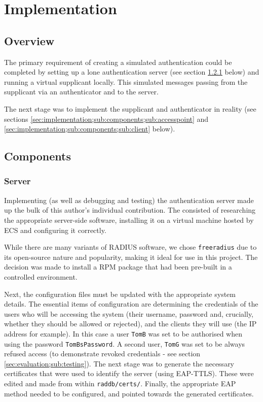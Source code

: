 \documentclass[12pt,a4paper,titlepage]{article}
\begin{document}
\newpage
\section{Implementation}

\subsection{Overview}
The primary requirement of creating a simulated authentication could be completed by setting up a lone authentication server (see section \ref{sec:implementation;sub:components;sub:server} below) and running a virtual supplicant locally. This simulated messages passing from the supplicant via an authenticator and to the server.

The next stage was to implement the supplicant and authenticator in reality (see sections \ref{sec:implementation;sub:components;sub:accesspoint} and \ref{sec:implementation;sub:components;sub:client} below).

\subsection{Components}

\subsubsection{Server}
\label{sec:implementation;sub:components;sub:server}
Implementing (as well as debugging and testing) the authentication server made up the bulk of this author's individual contribution. The consisted of researching the appropriate server-side software, installing it on a virtual machine hosted by ECS and configuring it correctly. 

While there are many variants of RADIUS software, we chose \texttt{freeradius} due to its open-source nature and popularity, making it ideal for use in this project. The decision was made to install a RPM package that had been pre-built in a controlled environment.

Next, the configuration files must be updated with the appropriate system details. The essential items of configuration are determining the credentials of the users who will be accessing the system (their username, password and, crucially, whether they should be allowed or rejected), and the clients they will use (the IP address for example). In this case a user \texttt{TomB} was set to be authorised when using the password \texttt{TomBsPassword}. A second user, \texttt{TomG} was set to be always refused access (to demonstrate revoked credentials - see section \ref{sec:evaluation;sub:testing}). The next stage was to generate the necessary certificates that were used to identify the server (using EAP-TTLS). These were edited and made from within \texttt{raddb/certs/}. Finally, the appropriate EAP method needed to be configured, and pointed towards the generated certificates.
\end{document}
